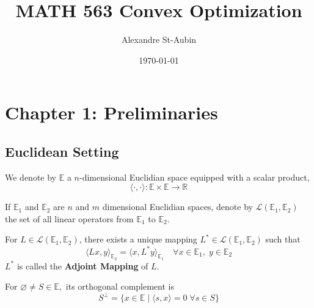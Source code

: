 \documentclass{tufte-handout}
\title{MATH 563 Convex Optimization}
\date{\today}
\author{Alexandre St-Aubin}
\makeatletter
\renewcommand{\maketitlepage}{%
\begingroup%
\setlength{\parindent}{0pt}

{\fontsize{18}{18}\selectfont\textit{\@author}\par}

\vspace{1.75in}{\fontsize{36}{54}\selectfont\@title\par}

\vspace{0.5in}{\fontsize{14}{14}\selectfont\textsf{\smallcaps{\@date}}\par}

\vspace{0.5in}\usebox{\titleimage}

\vfill{\fontsize{14}{14}\selectfont\textit{\@publisher}\par}

\thispagestyle{empty}
\endgroup
\newpage
}
\makeatother
\begin{document}
\maketitlepage%

\tableofcontents
\newpage

\section{Chapter 1: Preliminaries}
\subsection{Euclidean Setting}%
  \label{sub:Eucledian Setting}
  We denote by $\mathbb{E}$ a $n$-dimensional Euclidian space equipped with a scalar product, 
  $$\langle \cdot, \cdot \rangle : \mathbb{E}\times \mathbb{E} \to \mathbb{R} $$
  
\begin{definition}
  If $\mathbb{E}_1$ and $\mathbb{E}_2$ are $n$ and $m$ dimensional Euclidian spaces, denote by $\mathcal{L} (\mathbb{E}_1,\mathbb{E}_2)$ the set of all linear operators from $\mathbb{E}_1$ to $\mathbb{E}_2$.
\end{definition}
\begin{remark} 
  For $L \in \mathcal{L}(\mathbb{E}_1, \mathbb{E}_2)$, there exists a unique mapping $L^* \in \mathcal{L}(\mathbb{E}_1, \mathbb{E}_2)$ such that 
  $$\langle Lx, y \rangle_{\mathbb{E}_2} = \langle x, L^*y\rangle_{\mathbb{E}_1} \quad \forall x \in \mathbb{E}_1, \; y \in \mathbb{E}_2 $$
  $L^*$ is called the \textbf{Adjoint Mapping} of $L$.
\end{remark}
\begin{definition}
  For $\varnothing \neq S \in \mathbb{E},$ its orthogonal complement is $$S^\perp = \{x \in \mathbb{E} \mid \langle s,x \rangle =0 \; \forall s \in S\} $$ 
\end{definition}
\end{document}

